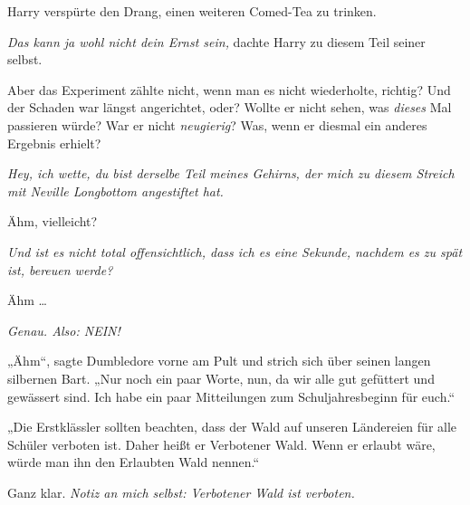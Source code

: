 Harry verspürte den Drang, einen weiteren Comed-Tea zu trinken.

\emph{Das kann ja wohl nicht dein Ernst sein,} dachte Harry zu diesem Teil seiner selbst.

Aber das Experiment zählte nicht, wenn man es nicht wiederholte, richtig? Und der Schaden war längst angerichtet, oder? Wollte er nicht sehen, was \emph{dieses} Mal passieren würde? War er nicht \emph{neugierig}? Was, wenn er diesmal ein anderes Ergebnis erhielt?

\emph{Hey, ich wette, du bist derselbe Teil meines Gehirns, der mich zu diesem Streich mit Neville Longbottom angestiftet hat.}

Ähm, vielleicht?

\emph{Und ist es nicht total offensichtlich, dass ich es eine Sekunde, nachdem es zu spät ist, bereuen werde?}

Ähm …

\emph{Genau. Also: NEIN!}

„Ähm“, sagte Dumbledore vorne am Pult und strich sich über seinen langen silbernen Bart.
„Nur noch ein paar Worte, nun, da wir alle gut gefüttert und gewässert sind. Ich habe ein paar Mitteilungen zum Schuljahresbeginn für euch.“

„Die Erstklässler sollten beachten, dass der Wald auf unseren Ländereien für alle Schüler verboten ist. Daher heißt er Verbotener Wald. Wenn er erlaubt wäre, würde man ihn den Erlaubten Wald nennen.“

Ganz klar. \emph{Notiz an mich selbst: Verbotener Wald ist verboten.}

